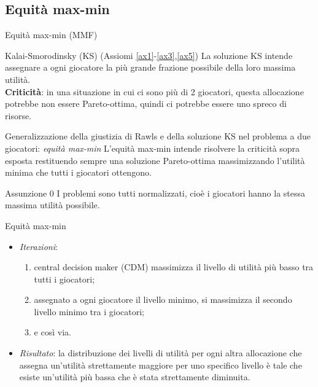 \documentclass{beamer}
\begin{document}
\subsection{Equità max-min}

\begin{frame}{Equità max-min (MMF)}
	\begin{block}{Kalai-Smorodinsky (KS) (Assiomi \ref{ax1}-\ref{ax3},\ref{ax5})}
		La soluzione KS intende assegnare a ogni giocatore la più grande frazione possibile della loro massima utilità.\\
		\textbf{Criticità}: in una situazione in cui ci sono più di 2 giocatori, questa allocazione potrebbe non essere Pareto-ottima, quindi ci potrebbe essere uno spreco di risorse.
	\end{block}
	\begin{block}{ Generalizzazione della giustizia di Rawls e della soluzione KS nel problema a due giocatori: \textit{equità max-min} }
		L'equità max-min intende risolvere la criticità sopra esposta restituendo sempre una soluzione Pareto-ottima massimizzando l'utilità minima che tutti i giocatori ottengono.
	\end{block}
\end{frame}

\begin{frame}
	\begin{block}{Assunzione 0}
		I problemi sono tutti normalizzati, cioè i giocatori hanno la stessa massima utilità possibile.
	\end{block}
	\begin{block}{Equità max-min}
		\begin{itemize}
			\item \textit{Iterazioni}:
			\vspace{-0.1cm}
			\begin{enumerate}
			\item central decision maker (CDM) massimizza il livello di utilità più basso tra tutti i giocatori; \\
			\item assegnato a ogni giocatore il livello minimo, si massimizza il secondo livello minimo tra i giocatori; \\
			\item e così via.\\
			\end{enumerate}
			\item \textit{Risultato}:
			la distribuzione dei livelli di utilità per ogni altra allocazione che assegna un'utilità strettamente maggiore per uno specifico livello è tale che esiste un'utilità più bassa che è stata strettamente diminuita.
		\end{itemize}
	\end{block}
\end{frame}
\end{document}

